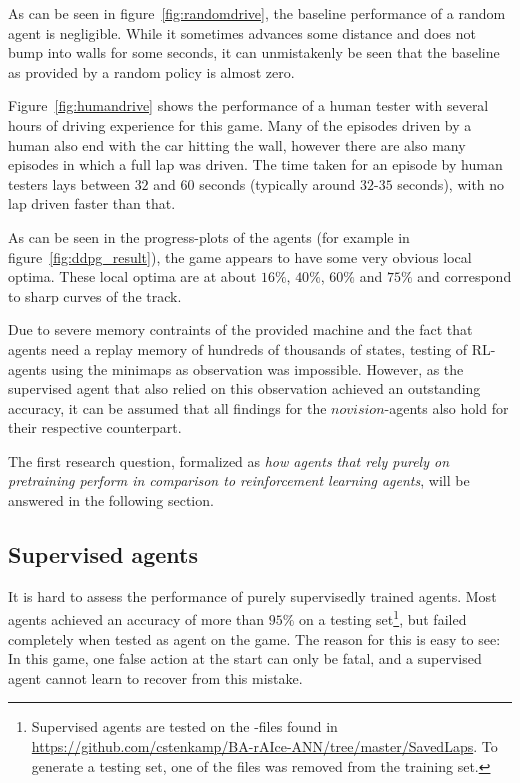 As can be seen in figure~\ref{fig:randomdrive}, the baseline performance of a random agent is negligible. While it sometimes advances some distance and does not bump into walls for some seconds, it can unmistakenly be seen that the baseline as provided by a random policy is almost zero.

Figure~\ref{fig:humandrive} shows the performance of a human tester with several hours of driving experience for this game. Many of the episodes driven by a human also end with the car hitting the wall, however there are also many episodes in which a full lap was driven. The time taken for an episode by human testers lays between $32$ and $60$ seconds (typically around $32$-$35$ seconds), with no lap driven faster than that.

As can be seen in the progress-plots of the agents (for example in figure~\ref{fig:ddpg_result}), the game appears to have some very obvious local optima. These local optima are at about $16\%$, $40\%$, $60\%$ and $75\%$ and correspond to sharp curves of the track.

Due to severe memory contraints of the provided machine and the fact that agents need a replay memory of hundreds of thousands of states, testing of RL-agents using the minimaps as observation was impossible. However, as the supervised agent that also relied on this observation achieved an outstanding accuracy, it can be assumed that all findings for the $novision$-agents also hold for their respective counterpart.

The first research question, formalized as \textit{how agents that rely purely on pretraining perform in comparison to reinforcement learning agents}, will be answered in the following section.

\subsection{Supervised agents}
\label{sec:resultsupervised}

It is hard to assess the performance of purely supervisedly trained agents. Most agents achieved an accuracy of more than $95\%$ on a testing set\footnote{Supervised agents are tested on the -files found in \url{https://github.com/cstenkamp/BA-rAIce-ANN/tree/master/SavedLaps}. To generate a testing set, one of the files was removed from the training set.}, but failed completely when tested as agent on the game. The reason for this is easy to see: In this game, one false action at the start can only be fatal, and a supervised agent cannot learn to recover from this mistake.

